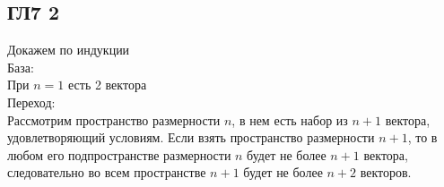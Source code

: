 \subsection*{ГЛ7 2}
Докажем по индукции\\
База:\\
При $n=1$ есть 2 вектора\\
Переход:\\
Рассмотрим пространство размерности $n$, в нем есть набор из $n+1$ вектора, удовлетворяющий условиям. Если взять пространство размерности $n+1$, то в любом его подпространстве размерности $n$ будет не более $n+1$ вектора, следовательно во всем пространстве $n+1$ будет не более $n+2$ векторов.\\ 